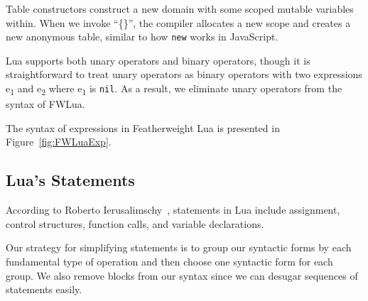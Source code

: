 Table constructors
construct a new domain with some scoped mutable variables within.
When we invoke ``\{\}'', the compiler allocates a new scope
and creates a new anonymous table, similar to how {\tt new} works in JavaScript.

Lua supports both
unary operators and binary operators, though it is straightforward to treat unary operators as binary operators
with two expressions e\textsubscript{1} and e\textsubscript{2} where e\textsubscript{1} is {\tt nil}.
As a result, we eliminate unary operators from the syntax of FWLua.


The syntax of expressions in Featherweight Lua is presented in Figure~\ref{fig:FWLuaExp}.


\subsection{Lua's Statements}
According to Roberto Ierusalimschy~\cite{PIL},
statements in Lua include assignment, control structures, function calls, and variable declarations.

Our strategy for simplifying statements is to group our syntactic forms by each fundamental type of operation and then choose one syntactic form for each group.
We also remove blocks from our syntax since we can desugar sequences of statements easily.

